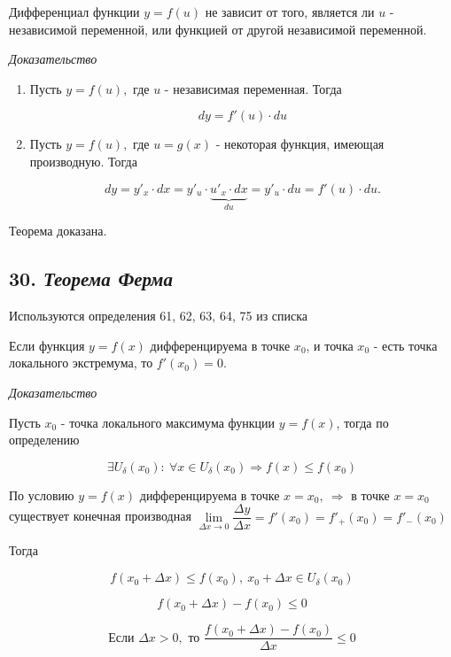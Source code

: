 Дифференциал функции $y = f(u)$ не зависит от того, является ли $u$ - независимой переменной, или функцией от другой независимой переменной.
\vspace*{20pt} 

\textit{Доказательство}
\begin{enumerate}

\item Пусть $y = f(u),$ где $u$ - независимая переменная. Тогда

$$dy = f'(u)\cdot du
    $$
\item Пусть $y = f(u),$ где $u = g(x)$ - некоторая функция, имеющая производную. Тогда

$$dy = y'_x\cdot dx = y'_u\cdot \underbrace{u'_x \cdot dx}_{du} = y'_u\cdot du = f'(u) \cdot du.
    $$

\end{enumerate}

Теорема доказана.
\newpage 
\subsection*{30. \textit{Теорема Ферма}}
\begin{Quote2} 
\small\centering 

Используются определения 61, 62, 63, 64, 75 из списка \end{Quote2} 

Если функция $y = f(x)$ дифференцируема в точке $x_0$, и точка $x_0$ - есть точка локального экстремума, то $f'(x_0) = 0$.
\vspace*{20pt} 

\textit{Доказательство}

Пусть $x_0$ - точка локального максимума функции $y = f(x)$, тогда по определению

$$
\exists U_\delta(x_0) : \ \forall x \in U_\delta(x_0) \Rightarrow f(x) \leqslant f(x_0)
$$

По условию $y = f(x)$ дифференцируема в точке $x = x_0, \ \Rightarrow$ в точке $x = x_0$ существует конечная производная $\lim\limits_{\Delta x \rightarrow 0}{\dfrac{\Delta y}{\Delta x}} = f'(x_0) = f'_+(x_0) = f'_-(x_0)$

Тогда

$$
f(x_0 + \Delta x) \leqslant f(x_0), \ x_0 + \Delta x \in U_\delta(x_0)
$$

$$
f(x_0 + \Delta x) - f(x_0) \leqslant 0
$$

$$
\text{Если } \Delta x > 0, \text{ то } {\dfrac{f(x_0+\Delta x) - f(x_0)}{\Delta x}} \leqslant 0
$$

